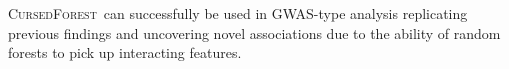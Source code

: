 \documentclass[10pt,letterpaper]{article}
\newlength\savedwidth
\newcommand\thickhline{\noalign{\global\savedwidth\arrayrulewidth\global\arrayrulewidth 2pt}%
\hline
\noalign{\global\arrayrulewidth\savedwidth}}
\newcommand{\cursedforest}{\textsc{CursedForest}\xspace}
\begin{document}
\cursedforest\ can successfully be used in GWAS-type analysis replicating previous findings and uncovering novel
associations due to the ability of random forests to pick up interacting features.


\end{document}
